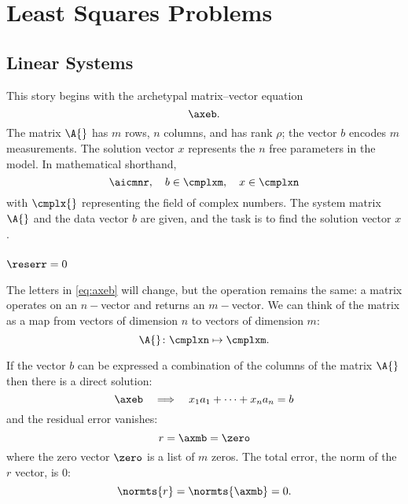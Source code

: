 \chapter{Least Squares Problems}

\section{Linear Systems}  %

  This story begins with the archetypal  matrix--vector equation
  \begin{equation}   %
    \axeb .
    \label{eq:axeb}
  \end{equation}
The matrix $\A{}$ has $m$ rows, $n$ columns, and has rank $\rho$; the vector $b$ encodes $m$ measurements. The solution vector $x$ represents the $n$ free parameters in the model. In mathematical shorthand,
  \begin{equation}   %
    \aicmnr, \quad b \in \cmplxm, \quad x \in \cmplxn
  \label{eq:basics}
  \end{equation}
with $\cmplx{}$ representing the field of complex numbers. The system matrix $\A{}$ and the data vector $b$ are given, and the task is to find the solution vector $x$.

\subsection{$\reserr = 0$}  %
The letters in \eqref{eq:axeb} will change, but the operation remains the same: a matrix operates on an $n-$vector and returns an $m-$vector. We can think of the  matrix as a map from vectors of dimension $n$ to vectors of dimension $m$:
  \begin{equation*}   %
    \A{} \colon \cmplxn \mapsto \cmplxm .
  \end{equation*}

If the vector $b$ can be expressed a combination of the columns of the matrix $\A{}$ then there is a direct solution:
\begin{equation*}
    \axeb \quad \Longrightarrow \quad x_{1} a_{1} + \cdots + x_{n} a_{n} = b
\end{equation*}
and the residual error  vanishes:
  \begin{equation*}   %
      r = \axmb = \zero
  \label{eq:axmb}
  \end{equation*}
where the zero vector $\zero$ is a list of $m$ zeros. The total error, the norm of the $r$ vector, is 0:
  \begin{equation*}   %
      \normts{r} = \normts{\axmb} = 0.
  \end{equation*}

